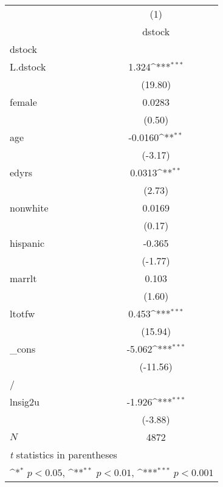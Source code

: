{
\def\sym#1{\ifmmode^{#1}\else\(^{#1}\)\fi}
\begin{tabular}{l*{1}{c}}
\hline\hline
            &\multicolumn{1}{c}{(1)}\\
            &\multicolumn{1}{c}{dstock}\\
\hline
dstock      &                     \\
L.dstock    &       1.324\sym{***}\\
            &     (19.80)         \\
[1em]
female      &      0.0283         \\
            &      (0.50)         \\
[1em]
age         &     -0.0160\sym{**} \\
            &     (-3.17)         \\
[1em]
edyrs       &      0.0313\sym{**} \\
            &      (2.73)         \\
[1em]
nonwhite    &      0.0169         \\
            &      (0.17)         \\
[1em]
hispanic    &      -0.365         \\
            &     (-1.77)         \\
[1em]
marrlt      &       0.103         \\
            &      (1.60)         \\
[1em]
ltotfw      &       0.453\sym{***}\\
            &     (15.94)         \\
[1em]
\_cons      &      -5.062\sym{***}\\
            &    (-11.56)         \\
\hline
/           &                     \\
lnsig2u     &      -1.926\sym{***}\\
            &     (-3.88)         \\
\hline
\(N\)       &        4872         \\
\hline\hline
\multicolumn{2}{l}{\footnotesize \textit{t} statistics in parentheses}\\
\multicolumn{2}{l}{\footnotesize \sym{*} \(p<0.05\), \sym{**} \(p<0.01\), \sym{***} \(p<0.001\)}\\
\end{tabular}
}
